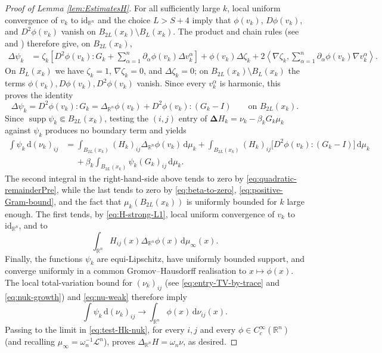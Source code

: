 \documentclass[12pt,a4paper,reqno]{amsart}
\newcommand{\supp}{\operatorname{supp}}
\begin{document}
\begin{proof}[Proof of Lemma \ref{lem:EstimatesH}]
For all sufficiently large $k$, local uniform convergence of $v_k$ to
$\mathrm{id}_{\mathbb R^n}$ and the choice $L>S+4$ imply that
$\phi(v_k)$, $D\phi(v_k)$, and $D^2\phi(v_k)$ vanish on
$B_{2L}(x_k)\setminus B_L(x_k)$.  The product and chain rules (see \cite[Equation (2.3.24) and Lemma 3.1.4]{GigliNDG} and \cite[Propositions 4.1 and 4.3]{GigliViolo}) therefore
give, on $B_{2L}(x_k)$,
\[
 \begin{aligned}
 \Delta\psi_k
 &=\zeta_k\left[
      D^2\phi(v_k):G_k
      +\sum_{\alpha=1}^n
        \partial_\alpha\phi(v_k)\Delta v_k^\alpha
    \right]
   +\phi(v_k)\Delta\zeta_k 
   +2\left\langle\nabla\zeta_k,
       \sum_{\alpha=1}^n
       \partial_\alpha\phi(v_k)\nabla v_k^\alpha
     \right\rangle .
 \end{aligned}
\]
On $B_L(x_k)$ we have $\zeta_k=1$,
$\nabla\zeta_k=0$, and $\Delta\zeta_k=0$; on
$B_{2L}(x_k)\setminus B_L(x_k)$ the terms $\phi(v_k),D\phi(v_k),D^2\phi(v_k)$
vanish.  Since every $v_k^\alpha$ is harmonic, this proves the
identity
\begin{equation}\label{eq:chain-rule-test}
 \Delta\psi_k
 =D^2\phi(v_k):G_k
 =\Delta_{\mathbb R^n}\phi(v_k)
   +D^2\phi(v_k):(G_k-I)
 \qquad\text{on }B_{2L}(x_k).
\end{equation}
Since $\supp\psi_k\Subset B_{2L}(x_k)$, testing the $(i,j)$ entry of
$\mathbf{\Delta}H_k=\nu_k-\beta_kG_k\mu_k$ against $\psi_k$ produces no
boundary term and yields
\begin{equation}\label{eq:test-Hk-nuk}
\begin{aligned}
 \int\psi_k\,\mathrm{d}(\nu_k)_{ij}
 &=\int_{B_{2L}(x_k)}
      (H_k)_{ij}\Delta_{\mathbb R^n}\phi(v_k)\,\mathrm{d}\mu_k+
 \int_{B_{2L}(x_k)}
      (H_k)_{ij}
      \bigl[D^2\phi(v_k):(G_k-I)\bigr]\,\mathrm{d}\mu_k\\&\phantom{+}+
 \beta_k\int_{B_{2L}(x_k)}
      \psi_k(G_k)_{ij}\,\mathrm{d}\mu_k.
\end{aligned}
\end{equation}
The second integral in the right-hand-side above tends to zero by
\eqref{eq:quadratic-remainderPre}, while the last tends to zero by
\eqref{eq:beta-to-zero}, \eqref{eq:positive-Gram-bound}, and the fact that $\mu_k(B_{2L}(x_k))$ is uniformly bounded for $k$ large enough.  The first tends, by
\eqref{eq:H-strong-L1}, local uniform convergence of $v_k$ to $\mathrm{id}_{\mathbb R^n}$, and \cite[Proposition 3.27]{HondaLp} to
\[
 \int_{\mathbb R^n}H_{ij}(x)\Delta_{\mathbb R^n}\phi(x)
 \,\mathrm{d}\mu_\infty(x).
\]
Finally, the functions $\psi_k$ are equi-Lipschitz, have uniformly
bounded support, and converge uniformly in a common Gromov--Hausdorff
realisation to $x\mapsto\phi(x)$.  The local total-variation bound for
$(\nu_k)_{ij}$ (see \eqref{eq:entry-TV-by-trace} and \eqref{eq:nuk-growth}) and \eqref{eq:nu-weak} therefore imply
\[
 \int\psi_k\,\mathrm{d}(\nu_k)_{ij}\to 
 \int_{\mathbb R^n}\phi(x)\,\mathrm{d}\nu_{ij}(x).
\]
Passing to the limit in \eqref{eq:test-Hk-nuk}, for every $i,j$ and every
$\phi\in C_c^\infty(\mathbb R^n)$ (and recalling $\mu_\infty=\omega_n^{-1}\mathcal L^n$), proves
 $\Delta_{\mathbb R^n}H=\omega_n\nu$,
as desired.
\end{proof}
\end{document}
